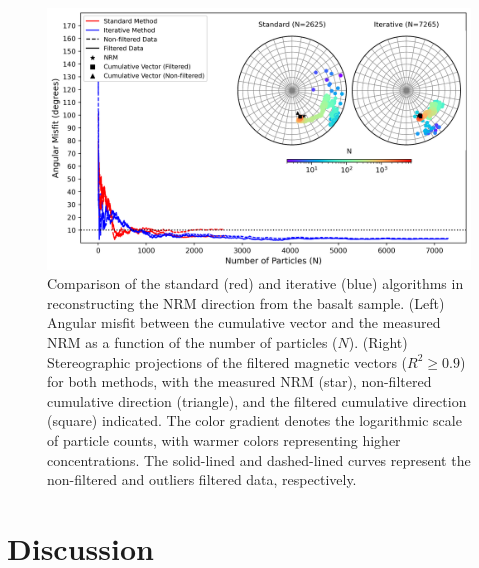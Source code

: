 \begin{figure}[tb!]
  \centering
  \includegraphics[width=1\linewidth]{micromag-interfering-sources/figures/basalt-data-stereoplot.png}
  \caption{
  Comparison of the standard (red) and iterative (blue) algorithms in reconstructing the NRM direction from the basalt sample. (Left) Angular misfit between the cumulative vector and the measured NRM as a function of the number of particles ($N$). (Right) Stereographic projections of the filtered magnetic vectors ($R^2 \geq 0.9$) for both methods, with the measured NRM (star), non-filtered cumulative direction (triangle), and the filtered cumulative direction (square) indicated. The color gradient denotes the logarithmic scale of particle counts, with warmer colors representing higher concentrations. The solid-lined and dashed-lined curves represent the non-filtered and outliers filtered data, respectively.
  }
  \label{basalt-data-stereograms}
\end{figure}

\section{Discussion}

